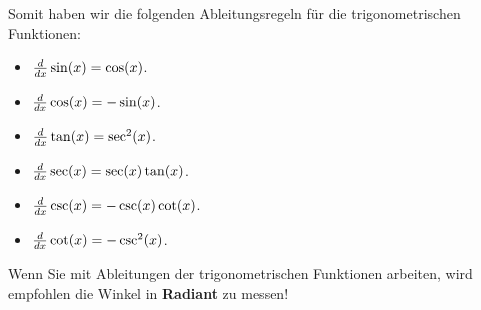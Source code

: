 Somit haben wir die folgenden Ableitungsregeln für die trigonometrischen Funktionen:

\begin{mainTheorem} \hfil
\begin{itemize}
\item $\frac{d}{dx} \sin(x) = \cos(x)$.
\item $\frac{d}{dx} \cos(x) = -\sin(x)$.
\item $\frac{d}{dx} \tan(x) = \sec^2(x)$.
\item $\frac{d}{dx} \sec(x) = \sec(x)\tan(x)$.
\item $\frac{d}{dx} \csc(x) = -\csc(x)\cot(x)$.
\item $\frac{d}{dx} \cot(x) = -\csc^2(x)$.
\end{itemize}
\end{mainTheorem}


\begin{warning}
Wenn Sie mit Ableitungen der trigonometrischen Funktionen arbeiten, wird empfohlen die Winkel in \textbf{Radiant} zu messen!
\end{warning}



